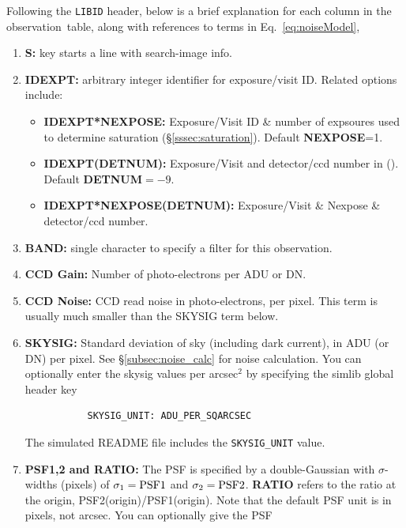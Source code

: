 \documentclass[12pt]{article}
\newcommand{\obs}{observation}
\begin{document}
{%
Following the {\tt LIBID} header,
below is a brief explanation for each column in the \obs\ table,
along with references to terms in Eq.~\ref{eq:noiseModel},
\begin{enumerate}
%
  \item  {\bf S:} key starts a line with search-image info.
%
  \item {\bf IDEXPT:} arbitrary integer identifier for exposure/visit ID. Related options include:
     \begin{itemize}
       \item {\bf IDEXPT*NEXPOSE:} Exposure/Visit ID \& number of expsoures used to determine saturation
            (\S\ref{sssec:saturation}). Default {\bf NEXPOSE}=1.
       \item {\bf IDEXPT(DETNUM):} Exposure/Visit and detector/ccd number in (). \\
            Default {\bf DETNUM}$=-9$.
       \item {\bf IDEXPT*NEXPOSE(DETNUM):} Exposure/Visit \& Nexpose \& detector/ccd number.
     \end{itemize}
%
  \item {\bf BAND:} single character to specify a filter for this observation.
%
  \item {\bf CCD Gain:} Number of photo-electrons per ADU or DN.
%
  \item {\bf CCD Noise:} CCD read noise in photo-electrons, per pixel.
        This term is usually much smaller than the SKYSIG term below.
%
  \item {\bf SKYSIG:}  Standard deviation of sky (including dark current), 
        in ADU (or DN) per pixel.
        See \S\ref{subsec:noise_calc} for noise calculation.
	You can optionally enter the skysig values per arcsec$^2$ 
	by specifying the simlib global header key 
        \vspace{-0.4cm}
	\begin{verbatim} 
           SKYSIG_UNIT: ADU_PER_SQARCSEC 
	\end{verbatim} 
        \vspace{-0.4cm}
	The simulated README file includes the {\tt SKYSIG\_UNIT}
	value.
%
  \item {\bf PSF1,2 and RATIO:} The PSF is specified by a double-Gaussian
         with $\sigma$-widths (pixels) of 
	 $\sigma_1 = {\rm PSF1}$ and 
	 $\sigma_2 = {\rm PSF2}$.
	 {\bf RATIO} refers to the ratio at the origin,
	 PSF2(origin)/PSF1(origin). Note that the default PSF unit
	 is in pixels, not arcsec. You can optionally give the PSF 

\end{enumerate}}
\end{document}
